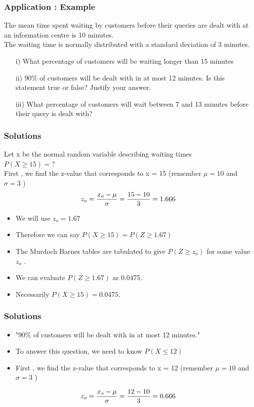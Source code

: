 \begin{frame}
\frametitle{Application : Example }
The mean time spent waiting by customers before their queries are dealt with at an information centre is 10 minutes.\\ \smallskip
The waiting time is normally distributed with a standard deviation of 3 minutes.
\begin{itemize}
\item [i)] What percentage of customers will be waiting longer than 15 minutes

\item [ii)] $90\%$ of customers will be dealt with in at most 12 minutes. Is this statement true or false?
Justify your answer.

\item [iii)] What percentage of customers will wait between 7 and 13 minutes before their query is dealt with?
\end{itemize}
\end{frame}
\begin{frame}
\frametitle{Solutions}

Let x be the normal random variable describing waiting times\\
$P(X \geq 15) =?$ \\
\bigskip
     First , we find the z-value that corresponds to x = 15  (remember $\mu=10$ and $\sigma=3$  )\\
\[ z_o = { x_o - \mu \over \sigma }  = { 15 - 10 \over 3 } = 1.666 \]
\begin{itemize}
\item We will use $z_o =1.67$
\item Therefore we can say $P(X \geq 15 ) = P(Z \geq 1.67)$
\item The Murdoch Barnes tables are tabulated to give $P(Z \geq z_o)$ for some value $ z_o$ .
\item We can evaluate $P(Z \geq 1.67)$  as 0.0475.
\item Necessarily $P(X \geq 15) = 0.0475$.
\end{itemize}
\end{frame}

\begin{frame}
\frametitle{Solutions}
\begin{itemize}
\item "$90\%$ of customers will be dealt with in at most 12 minutes."
\item To answer this question, we need to know  $P(X\leq 12)$
\item First , we find the z-value that corresponds to x = 12  (remember $\mu=10$ and $\sigma=3$ )
\end{itemize}
\[ z_o = { x_o - \mu \over \sigma }  = { 12 - 10 \over 3 } = 0.666 \]

\end{frame}


